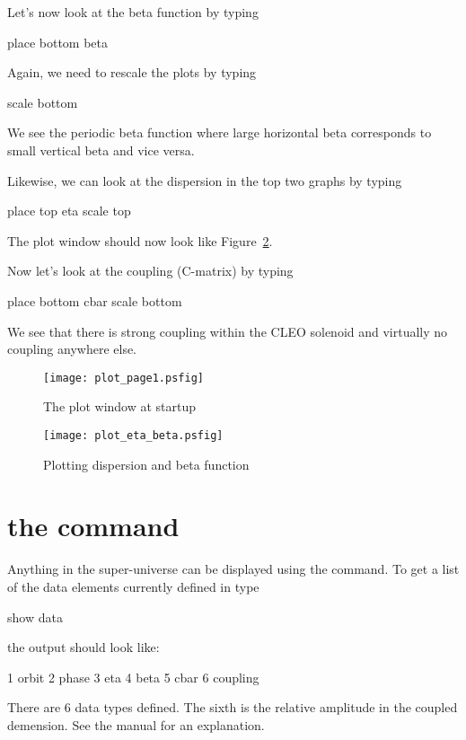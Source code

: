 \documentclass{report}
\begin{document}
Let's now look at the beta function by typing
\begin{example}
  place bottom beta
\end{example}
Again, we need to rescale the plots by typing
\begin{example}
  scale bottom
\end{example}
We see the periodic beta function where large horizontal beta corresponds to
small vertical beta and vice versa.

Likewise, we can look at the dispersion in the top two graphs by typing
\begin{example}
  place top eta
  scale top
\end{example}
The plot window should now look like Figure~\ref{f:plot_eta_beta}.

Now let's look at the coupling (C-matrix) by typing
\begin{example}
  place bottom cbar
  scale bottom
\end{example}
We see that there is strong coupling within the CLEO solenoid and virtually no
coupling anywhere else.

\begin{figure}
  \centering
  \texttt{[image: plot\_page1.psfig]}
  \caption{The plot window at startup}
  \label{f:plot_begin}
\end{figure}

\begin{figure}
  \centering
  \texttt{[image: plot\_eta\_beta.psfig]}
  \caption{Plotting dispersion and beta function}
  \label{f:plot_eta_beta}
\end{figure}

\section{the  command}

Anything in the super-universe can be displayed using the  command. To
get a list of the data elements currently defined in \tao type
\begin{example}
  show data
\end{example}
the output should look like:
\begin{example}
   1  orbit
   2  phase
   3  eta
   4  beta
   5  cbar
   6  coupling
\end{example}
There are 6 data types defined. The sixth is the relative amplitude in
the coupled demension. See the manual for an explanation.
\end{document}
